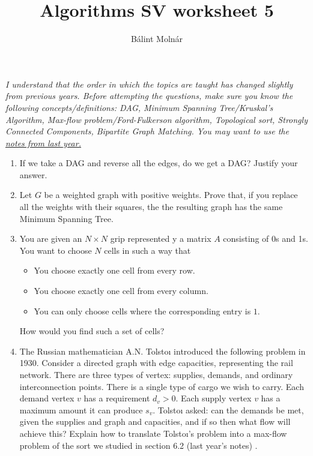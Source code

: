 \documentclass{article}
\title{{Algorithms SV worksheet 5}}
\author{Bálint Molnár}
\begin{document}
\maketitle
 
\emph{I understand that the order in which the topics are taught has changed slightly from previous years. Before attempting the questions, make sure you know the following concepts/definitions: DAG, Minimum Spanning Tree/Kruskal's Algorithm, Max-flow problem/Ford-Fulkerson algorithm, Topological sort, Strongly Connected Components, Bipartite Graph Matching. You may want to use the \href{https://www.cl.cam.ac.uk/teaching/2324/Algorithm1/content/algorithms2.pdf}{notes from last year.}} 

\begin{enumerate}
    \item If we take a DAG and reverse all the edges, do we get a DAG? Justify your answer.

    \item Let $G$ be a weighted graph with positive weights. Prove that, if you replace all the weights with their squares, the the resulting graph has the same Minimum Spanning Tree.

    \item You are given an $N \times N $ grip represented y a matrix $A$ consisting of 0s and 1s. You want to choose $N$ cells in such a way that
    \begin{itemize}
        \item You choose exactly one cell from every row.
        \item You choose exactly one cell from every column.
        \item You can only choose cells where the corresponding entry is $1$.
    \end{itemize}

    How would you find such a set of cells?

    \item The Russian mathematician A.N. Tolstoı introduced the following problem in 1930. Consider a
directed graph with edge capacities, representing the rail network. There are three types of vertex: supplies,
demands, and ordinary interconnection points. There is a single type of cargo we wish to carry. Each demand
vertex $v$ has a requirement $d_v > 0$. Each supply vertex $v$ has a maximum amount it can produce  $s_v$. Tolstoı
asked: can the demands be met, given the supplies and graph and capacities, and if so then what flow will achieve
this?
Explain how to translate Tolstoı’s problem into a max-flow problem of the sort we studied in section 6.2 \color{red} (last year's notes) \color{black}.


\end{enumerate}
\end{document}
